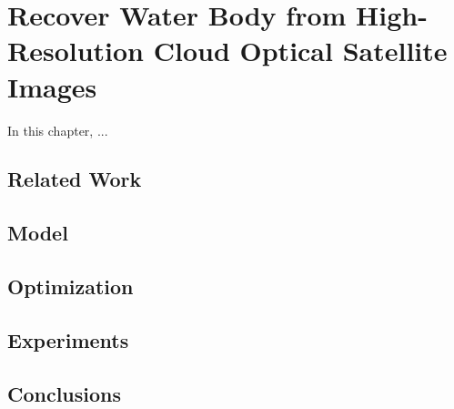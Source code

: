 \chapter{Recover Water Body from High-Resolution Cloud Optical Satellite Images}
\label{chap-3-recover-water-body}
\begin{ChapAbstract}
In this chapter, ...
\end{ChapAbstract}

\section{Related Work}

\section{Model}

\section{Optimization}

\section{Experiments}

\section{Conclusions}


